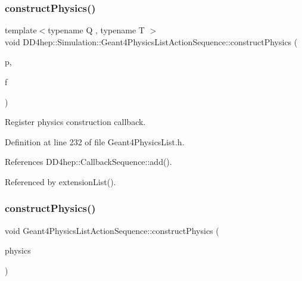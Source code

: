 \subsubsection{\texorpdfstring{construct\+Physics()}{constructPhysics()}\hspace{0.1cm}{\footnotesize\ttfamily [1/2]}}
{\footnotesize\ttfamily template$<$typename Q , typename T $>$ \\
void D\+D4hep\+::\+Simulation\+::\+Geant4\+Physics\+List\+Action\+Sequence\+::construct\+Physics (\begin{DoxyParamCaption}\item[{Q $\ast$}]{p,  }\item[{void(T\+::$\ast$)(G4\+V\+Modular\+Physics\+List $\ast$)}]{f }\end{DoxyParamCaption})\hspace{0.3cm}{\ttfamily [inline]}}



Register physics construction callback. 



Definition at line 232 of file Geant4\+Physics\+List.\+h.



References D\+D4hep\+::\+Callback\+Sequence\+::add().



Referenced by extension\+List().

\hypertarget{class_d_d4hep_1_1_simulation_1_1_geant4_physics_list_action_sequence_a6f06380a0f50652f86d496ec5ab46005}{}\label{class_d_d4hep_1_1_simulation_1_1_geant4_physics_list_action_sequence_a6f06380a0f50652f86d496ec5ab46005} 
\subsubsection{\texorpdfstring{construct\+Physics()}{constructPhysics()}\hspace{0.1cm}{\footnotesize\ttfamily [2/2]}}
{\footnotesize\ttfamily void Geant4\+Physics\+List\+Action\+Sequence\+::construct\+Physics (\begin{DoxyParamCaption}\item[{G4\+V\+Modular\+Physics\+List $\ast$}]{physics }\end{DoxyParamCaption})\hspace{0.3cm}{\ttfamily [virtual]}}




